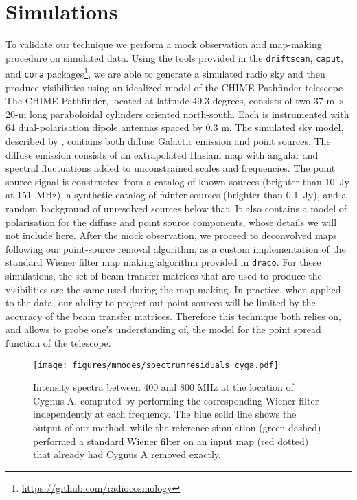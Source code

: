 \section{Simulations}
\label{ch:mm:sec:sims}

To validate our technique we perform a mock observation and map-making procedure on simulated data. Using the tools provided in the \texttt{driftscan}, \texttt{caput}, and \texttt{cora} packages\footnote{\url{https://github.com/radiocosmology}}, we are able to generate a simulated radio sky and then produce visibilities using an idealized model of the CHIME Pathfinder telescope \citep{chimepath1}. The CHIME Pathfinder, located at latitude 49.3 degrees, consists of two 37-m $\times$ 20-m long paraboloidal cylinders oriented north-south. Each is instrumented with 64 dual-polarisation dipole antennas spaced by 0.3 m. The simulated sky model, described by \cite{mmodes2}, contains both diffuse Galactic emission and point sources. The diffuse emission consists of an extrapolated Haslam map \citep{haslam1981, haslam1982} with angular and spectral fluctuations added to unconstrained scales and frequencies. The point source signal is constructed from a catalog of known sources (brighter than 10~Jy at 151~MHz), a synthetic catalog of fainter sources (brighter than 0.1~Jy), and a random background of unresolved sources below that. It also contains a model of polarisation for the diffuse and point source components, whose details we will not include here. After the mock observation, we proceed to deconvolved maps following our point-source removal algorithm, as a custom implementation of the standard Wiener filter map making algorithm provided in \texttt{draco}. For these simulations, the set of beam transfer matrices that are used to produce the visibilities are the same used during the map making. In practice, when applied to the data, our ability to project out point sources will be limited by the accuracy of the beam transfer matrices. Therefore this technique both relies on, and allows to probe one's understanding of, the model for the point spread function of the telescope.

\begin{figure}
\centering
\texttt{[image: figures/mmodes/spectrumresiduals\_cyga.pdf]}
\caption{Intensity spectra between 400 and 800 MHz at the location of Cygnus A, computed by performing the corresponding Wiener filter independently at each frequency. The blue solid line shows the output of our method, while the reference simulation (green dashed) performed a standard Wiener filter on an input map (red dotted) that already had Cygnus A removed exactly.}
\label{residuals}
\end{figure}

